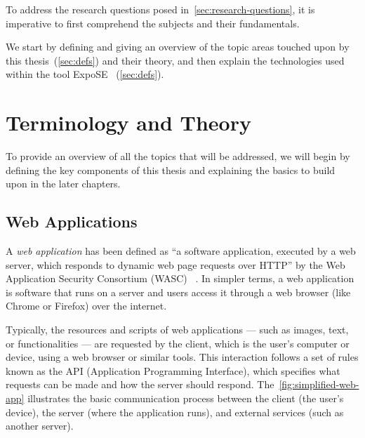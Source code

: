To address the research questions posed in~\autoref{sec:research-questions}, it is imperative to first comprehend the subjects and their fundamentals. 

We start by defining  and giving an overview of the topic areas touched upon by this thesis~(\autoref{sec:defs}) and their theory,  and then explain the technologies used within the tool ExpoSE ~(\autoref{sec:defs}).

\section{Terminology and Theory}
\label{sec:defs}
To provide an overview of all the topics that will be addressed, we will begin by defining the key components of this thesis and explaining the basics to build upon in the later chapters. 

\subsection{Web Applications}
\label{sec:webapp}
A \textit{web application} has been defined as “a software application, executed by a web server, which responds to dynamic web page requests over HTTP” by the Web Application Security Consortium (WASC) ~\cite{noauthor_web_2012}. 
In simpler terms, a web application is software that runs on a server and users access it through a web browser (like Chrome or Firefox) over the internet.

Typically, the resources and scripts of web applications — such as images, text, or functionalities — are requested by the client, which is the user's computer or device, using a web browser or similar tools. This interaction follows a set of rules known as the API (Application Programming Interface), which specifies what requests can be made and how the server should respond.
The~\autoref{fig:simplified-web-app} illustrates the basic communication process between the client (the user's device), the server (where the application runs), and external services (such as another server).

